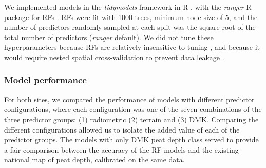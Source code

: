 \documentclass[soil, manuscript]{copernicus}
\begin{document}
We implemented models in the \emph{tidymodels} framework in R \citep{kuhnTidymodelsCollectionPackages2020}, with the \emph{ranger} R package for RFs \citep[v0.16,][]{wrightRangerFastImplementation2017}.
RFs were fit with 1000 trees, minimum node size of 5, and the number of predictors randomly sampled at each split was the square root of the total number of predictors (\emph{ranger} default).
We did not tune these hyperparameters because RFs are relatively insensitive to tuning \citep{probstHyperparametersTuningStrategies2019}, and because it would require nested spatial cross-validation to prevent data leakage \citep{schratzHyperparameterTuningPerformance2019}.

\subsubsection{Model performance}

For both sites, we compared the performance of models with different predictor configurations, where each configuration was one of the seven combinations of the three predictor groups: (1) radiometric (2) terrain and (3) DMK.
Comparing the different configurations allowed us to isolate the added value of each of the predictor groups.
The models with only DMK peat depth class served to provide a fair comparison between the accuracy of the RF models and the existing national map of peat depth, calibrated on the same data.
\end{document}
